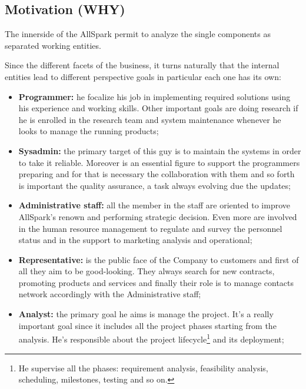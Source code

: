 \subsection{Motivation (WHY)}
\label{subsec:enterprise[Motivation]}
The innerside of the AllSpark permit to analyze the single components as separated working entities.


Since the different facets of the business, it turns naturally that the internal entities lead to different perspective goals in particular each one has its own:
\begin{itemize}
 \item {\bf Programmer:} he focalize his job in implementing required solutions using his experience and working skills. Other important goals are doing research if he is enrolled in the research team and system maintenance whenever he looks to manage the running products;
 \item {\bf Sysadmin:} the primary target of this guy is to maintain the systems in order to take it reliable. Moreover is an essential figure to support the programmers preparing and for that is necessary the collaboration with them and so forth is important the quality assurance, a task always evolving due the updates;
 \item {\bf Administrative staff:} all the member in the staff are oriented to improve AllSpark's renown and performing strategic decision. Even more are involved in the human resource management to regulate and survey the personnel status and in the support to marketing analysis and operational;
 \item {\bf Representative:} is the public face of the Company to customers and first of all they aim to be good-looking. They always search for new  contracts, promoting products and services and finally their role is to manage contacts network accordingly with the Administrative staff;
 \item {\bf Analyst:} the primary goal he aims is manage the project. It's a really important goal since it includes all the project phases starting from the analysis. He's responsible about the project lifecycle\footnote{He supervise all the phases: requirement analysis, feasibility analysis, scheduling, milestones, testing and so on.} and its deployment;
\end{itemize}



